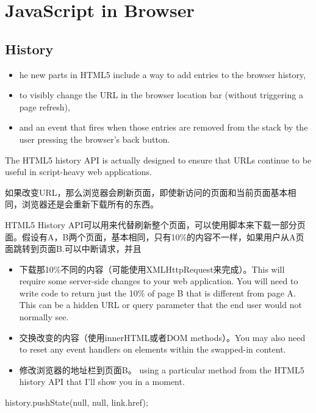 \chapter{JavaScript in Browser}



\section{History}

\begin{itemize}
\item he new parts in HTML5 include a way to add entries to the browser history, 
\item to visibly change the URL in the browser location bar (without triggering a page refresh), 
\item and an event that fires when those entries are removed from the stack by the user pressing the browser’s back button.
\end{itemize}



The HTML5 history API is actually designed to ensure that URLs continue to be useful in script-heavy web applications. 


如果改变URL，那么浏览器会刷新页面，即使新访问的页面和当前页面基本相同，浏览器还是会重新下载所有的东西。


HTML5 History API可以用来代替刷新整个页面，可以使用脚本来下载一部分页面。假设有A，B两个页面，基本相同，只有10\%的内容不一样，如果用户从A页面跳转到页面B.可以中断请求，并且

\begin{itemize}
\item 下载那10\%不同的内容（可能使用XMLHttpRequest来完成）。This will require some server-side changes to your web application. You will need to write code to return just the 10\% of page B that is different from page A. This can be a hidden URL or query parameter that the end user would not normally see. 

\item 交换改变的内容（使用innerHTML或者DOM methods）。You may also need to reset any event handlers on elements within the swapped-in content. 

\item 修改浏览器的地址栏到页面B。 using a particular method from the HTML5 history API that I’ll show you in a moment. 
\end{itemize}



\begin{JavaScript}
history.pushState(null, null, link.href);
\end{JavaScript}

